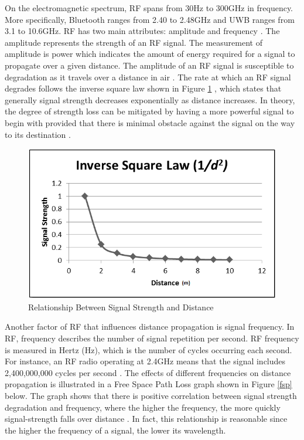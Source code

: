 \medskip
On the electromagnetic spectrum, RF spans from 30Hz to 300GHz in frequency. More specifically, Bluetooth ranges from 2.40 to 2.48GHz and UWB ranges from 3.1 to 10.6GHz. RF has two main attributes: amplitude and frequency \cite{R2-4-1}. The amplitude represents the strength of an RF signal. The measurement of amplitude is power which indicates the amount of energy required for a signal to propagate over a given distance. The amplitude of an RF signal is susceptible to degradation as it travels over a distance in air \cite{R2-4-1}. The rate at which an RF signal degrades follows the inverse square law shown in Figure \ref{isl} , which states that generally signal strength decreases exponentially as distance increases. In theory, the degree of strength loss can be mitigated by having a more powerful signal to begin with provided that there is minimal obstacle against the signal on the way to its destination \cite{R2-4-2}.

\medskip
\begin{figure}[H]
\centering
    \includegraphics[scale=0.8]{./images/ISL.png}
    \caption{Relationship Between Signal Strength and Distance}
    \label{isl}
\end{figure}


\medskip
Another factor of RF that influences distance propagation is signal frequency. In RF, frequency describes the number of signal repetition per second. RF frequency is measured in Hertz (Hz), which is the number of cycles occurring each second. For instance, an RF radio operating at 2.4GHz means that the signal includes 2,400,000,000 cycles per second \cite{R2-4-1}. The effects of different frequencies on distance propagation is illustrated in a Free Space Path Loss graph shown in Figure \ref{fsp} below. The graph shows that there is positive correlation between signal strength degradation and frequency, where the higher the frequency, the more quickly signal-strength falls over distance \cite{R2-4-2}. In fact, this relationship is reasonable since the higher the frequency of a signal, the lower its wavelength. 

